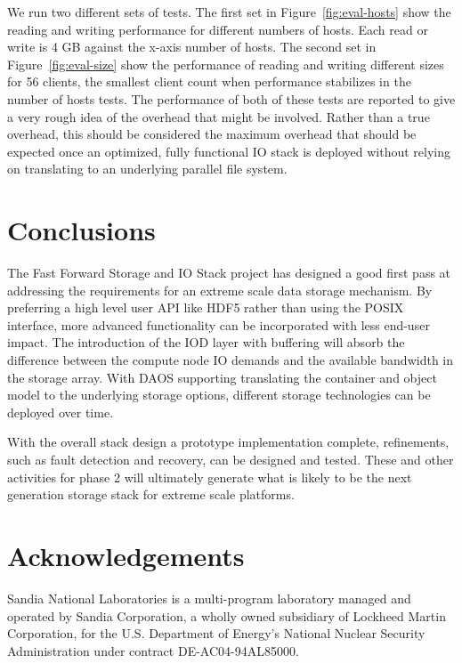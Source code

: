 \documentclass[conference]{IEEEtran} \pdfpagewidth=8.5in
\begin{document}
We run two different sets of tests. The first set in
Figure~\ref{fig:eval-hosts} show the reading and writing performance for
different numbers of hosts. Each read or write is 4 GB against the x-axis
number of hosts. The second set in Figure~\ref{fig:eval-size} show the
performance of reading and writing different sizes for 56 clients, the smallest
client count when performance stabilizes in the number of hosts tests.  The
performance of both of these tests are reported to give a very rough idea of
the overhead that might be involved. Rather than a true overhead, this should
be considered the maximum overhead that should be expected once an optimized,
fully functional IO stack is deployed without relying on translating to an
underlying parallel file system. 

\section{Conclusions}
\label{sec:conclusion}

The Fast Forward Storage and IO Stack project has designed a good first pass at
addressing the requirements for an extreme scale data storage mechanism.  By
preferring a high level user API like HDF5 rather than using the POSIX
interface, more advanced functionality can be incorporated with less end-user
impact. The introduction of the IOD layer with buffering will absorb the
difference between the compute node IO demands and the available bandwidth in
the storage array. With DAOS supporting translating the container and object
model to the underlying storage options, different storage technologies can be
deployed over time.

With the overall stack design a prototype implementation complete, refinements,
such as fault detection and recovery, can be designed and tested.  These and
other activities for phase 2 will ultimately generate what is likely to be the
next generation storage stack for extreme scale platforms.

\section{Acknowledgements}
Sandia National Laboratories is a multi-program laboratory managed and operated
by Sandia Corporation, a wholly owned subsidiary of Lockheed Martin
Corporation, for the U.S. Department of Energy's National Nuclear Security
Administration under contract DE-AC04-94AL85000.




\vfill\eject
\end{document}

